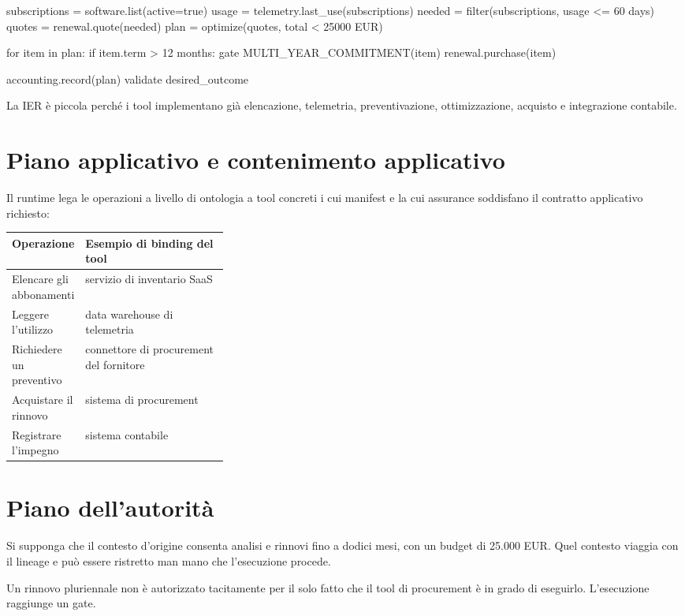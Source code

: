 \documentclass[10pt,oneside,openany]{book}
\begin{document}
\begin{codeblock}
subscriptions = software.list(active=true)
usage = telemetry.last_use(subscriptions)
needed = filter(subscriptions, usage <= 60 days)
quotes = renewal.quote(needed)
plan = optimize(quotes, total < 25000 EUR)

for item in plan:
  if item.term > 12 months:
    gate MULTI_YEAR_COMMITMENT(item)
  renewal.purchase(item)

accounting.record(plan)
validate desired_outcome
\end{codeblock}

La IER è piccola perché i tool implementano già elencazione, telemetria, preventivazione, ottimizzazione, acquisto e integrazione contabile.

\section{Piano applicativo e contenimento applicativo}
Il runtime lega le operazioni a livello di ontologia a tool concreti i cui manifest e la cui assurance soddisfano il contratto applicativo richiesto:

\begin{center}
\begin{tabularx}{0.95\linewidth}{>{\sffamily\small}p{0.32\linewidth} X}
\toprule
Operazione & Esempio di binding del tool \\
\midrule
Elencare gli abbonamenti & servizio di inventario SaaS \\
Leggere l'utilizzo & data warehouse di telemetria \\
Richiedere un preventivo & connettore di procurement del fornitore \\
Acquistare il rinnovo & sistema di procurement \\
Registrare l'impegno & sistema contabile \\
\bottomrule
\end{tabularx}
\end{center}

\section{Piano dell'autorità}
Si supponga che il contesto d'origine consenta analisi e rinnovi fino a dodici mesi, con un budget di 25.000 EUR. Quel contesto viaggia con il lineage e può essere ristretto man mano che l'esecuzione procede.

Un rinnovo pluriennale non è autorizzato tacitamente per il solo fatto che il tool di procurement è in grado di eseguirlo. L'esecuzione raggiunge un gate.
\end{document}
